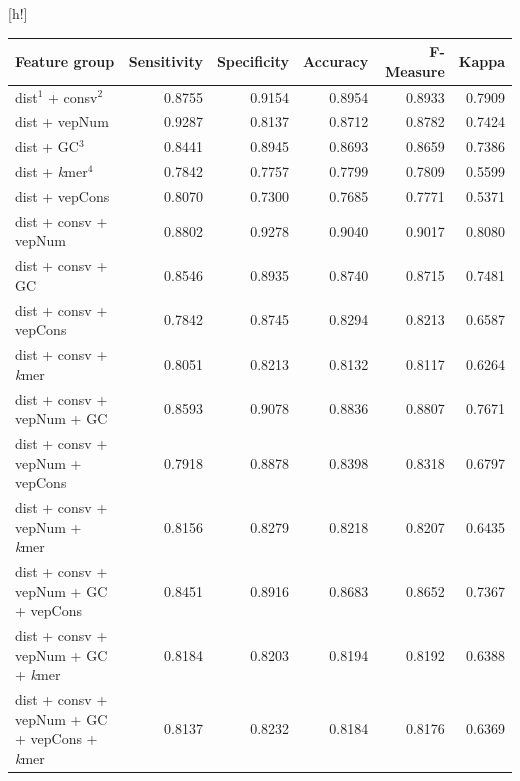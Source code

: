 \documentclass[a4paper,nohyper,nobib,openany,justified]{tufte-book}
\makeatletter
\renewenvironment{table}[1][htbp]{%
  \@tufte@orig@float{table}[#1]%
}{%
  \@tufte@orig@endfloat
}
\makeatother
\begin{document}
\begin{fullwidth}
\begin{table}[h!]
  \begin{center}
    \footnotesize%
    \begin{tabular}{p{6.5cm} rrrrr}
      \toprule
      Feature group & Sensitivity & Specificity & Accuracy & F-Measure & Kappa \\
      \midrule
    dist$^1$ + consv$^2$                                & 0.8755 & 0.9154 & 0.8954 & 0.8933 & 0.7909 \\
    dist + vepNum                               & 0.9287 & 0.8137 & 0.8712 & 0.8782 & 0.7424 \\
    dist + GC$^3$                                    & 0.8441 & 0.8945 & 0.8693 & 0.8659 & 0.7386 \\
    dist + \emph{k}mer$^4$                                 & 0.7842 & 0.7757 & 0.7799 & 0.7809 & 0.5599 \\
    dist + vepCons                              & 0.8070 & 0.7300 & 0.7685 & 0.7771 & 0.5371 \\\midrule
    dist + consv + vepNum                       & 0.8802 & 0.9278 & 0.9040 & 0.9017 & 0.8080 \\
    dist + consv + GC                         & 0.8546 & 0.8935 & 0.8740 & 0.8715 & 0.7481 \\
    dist + consv + vepCons                      & 0.7842 & 0.8745 & 0.8294 & 0.8213 & 0.6587 \\
    dist + consv + \emph{k}mer                         & 0.8051 & 0.8213 & 0.8132 & 0.8117 & 0.6264 \\\midrule
    dist + consv + vepNum + GC                  & 0.8593 & 0.9078 & 0.8836 & 0.8807 & 0.7671 \\
    dist + consv + vepNum + vepCons             & 0.7918 & 0.8878 & 0.8398 & 0.8318 & 0.6797 \\
    dist + consv + vepNum + \emph{k}mer                & 0.8156 & 0.8279 & 0.8218 & 0.8207 & 0.6435 \\\midrule
    dist + consv + vepNum + GC + vepCons        & 0.8451 & 0.8916 & 0.8683 & 0.8652 & 0.7367 \\
    dist + consv + vepNum + GC + \emph{k}mer           & 0.8184 & 0.8203 & 0.8194 & 0.8192 & 0.6388 \\\midrule
    dist + consv + vepNum + GC + vepCons + \emph{k}mer & 0.8137 & 0.8232 & 0.8184 & 0.8176 & 0.6369 \\
      \bottomrule
    \end{tabular}
  \end{center}
  \caption{Performance of different feature combinations for coding regions. Random forest classifier is built using training and validation set, and parameters are fine-tuned using 10-fold CV.\\
  $^1$conservation score; $^2$distance score; $^3$G + C content; $^4$\emph{k}-mer counts.}
  \label{tab:FeaComb_NC}
\end{table}


\end{fullwidth}
\end{document}
